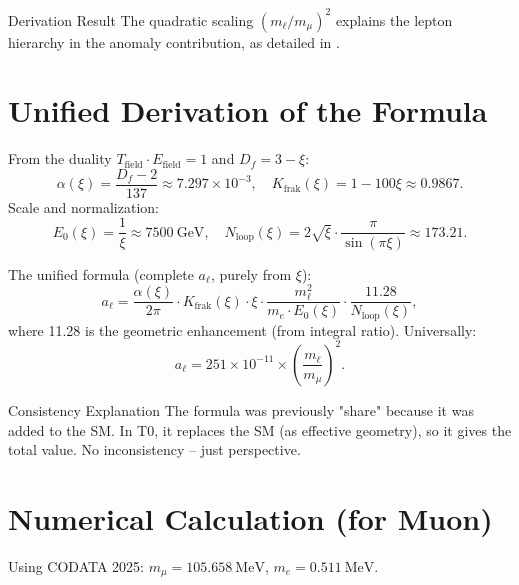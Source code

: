\documentclass[12pt,a4paper]{article}
\begin{document}
	\begin{result}{Derivation Result}
		The quadratic scaling $(m_\ell / m_\mu)^2$ explains the lepton hierarchy in the anomaly contribution, as detailed in \cite{hirachie}.
	\end{result}
	
	\section{Unified Derivation of the Formula}
	From the duality $T_\text{field} \cdot E_\text{field} = 1$ and $D_f = 3 - \xi$:
	\begin{equation}
		\alpha(\xi) = \frac{D_f - 2}{137} \approx 7.297 \times 10^{-3}, \quad K_\text{frak}(\xi) = 1 - 100 \xi \approx 0.9867.
	\end{equation}
	Scale and normalization:
	\begin{equation}
		E_0(\xi) = \frac{1}{\xi} \approx \SI{7500}{\giga\electronvolt}, \quad N_\text{loop}(\xi) = 2 \sqrt{\xi} \cdot \frac{\pi}{\sin(\pi \xi)} \approx 173.21.
	\end{equation}
	
	The unified formula (complete $a_\ell$, purely from $\xi$):
	\begin{equation}
		a_\ell = \frac{\alpha(\xi)}{2\pi} \cdot K_\text{frak}(\xi) \cdot \xi \cdot \frac{m_\ell^2}{m_e \cdot E_0(\xi)} \cdot \frac{11.28}{N_\text{loop}(\xi)},
	\end{equation}
	where 11.28 is the geometric enhancement (from integral ratio). Universally:
	\begin{equation}
		a_\ell = 251 \times 10^{-11} \times \left( \frac{m_\ell}{m_\mu} \right)^2.
	\end{equation}
	
	\begin{derivation}{Consistency Explanation}
		The formula was previously "share" because it was added to the SM. In T0, it replaces the SM (as effective geometry), so it gives the total value. No inconsistency – just perspective.
	\end{derivation}
	
	\section{Numerical Calculation (for Muon)}
	Using CODATA 2025: $m_\mu = \SI{105.658}{\mega\electronvolt}$, $m_e = \SI{0.511}{\mega\electronvolt}$.
	
\end{document}
